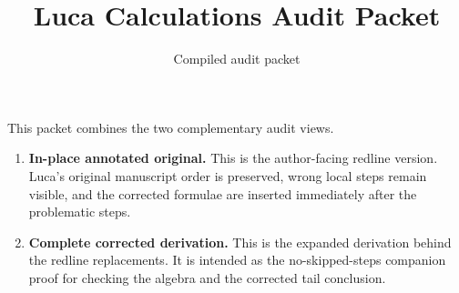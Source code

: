 \documentclass[11pt]{article}
\title{Luca Calculations Audit Packet}
\author{}
\date{Compiled audit packet}
\begin{document}
\maketitle

\noindent
This packet combines the two complementary audit views.

\begin{enumerate}
  \item \textbf{In-place annotated original.}
  This is the author-facing redline version.  Luca's original manuscript order
  is preserved, wrong local steps remain visible, and the corrected formulae are
  inserted immediately after the problematic steps.
  \item \textbf{Complete corrected derivation.}
  This is the expanded derivation behind the redline replacements.  It is
  intended as the no-skipped-steps companion proof for checking the algebra and
  the corrected tail conclusion.
\end{enumerate}

\clearpage


\end{document}

